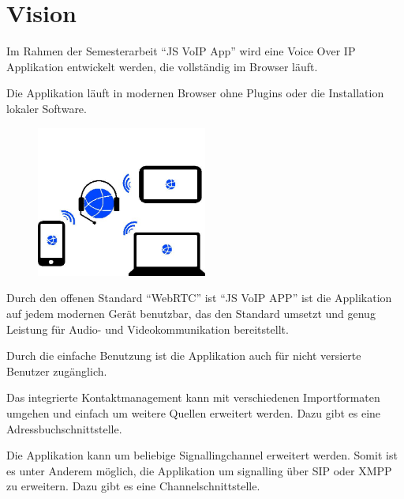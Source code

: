   \chapter{Vision}
	Im Rahmen der Semesterarbeit ``JS VoIP App'' wird eine Voice Over IP Applikation entwickelt werden, die vollständig im Browser läuft.
	
	Die Applikation läuft in modernen Browser ohne Plugins oder die Installation lokaler Software.
			
	\begin{figure}[H]
		\centering
		\includegraphics[width=0.5\textwidth]{img/plattformUnabhaengigkeit.jpg}
		\label{plattformUnabhaengigkeit}
	\end{figure}
	
	Durch den offenen Standard ``WebRTC'' ist ``JS VoIP APP'' ist die Applikation auf jedem modernen Gerät benutzbar, das den Standard umsetzt und genug Leistung für Audio- und Videokommunikation bereitstellt.
	
	Durch die einfache Benutzung ist die Applikation auch für nicht versierte Benutzer zugänglich.
	
	Das integrierte Kontaktmanagement kann mit verschiedenen Importformaten umgehen und einfach um weitere Quellen erweitert werden. Dazu gibt es eine Adressbuchschnittstelle.
	
	Die Applikation kann um beliebige Signallingchannel erweitert werden. Somit ist es unter Anderem möglich, die Applikation um signalling über SIP oder XMPP zu erweitern. Dazu gibt es eine Channelschnittstelle.
	
		
